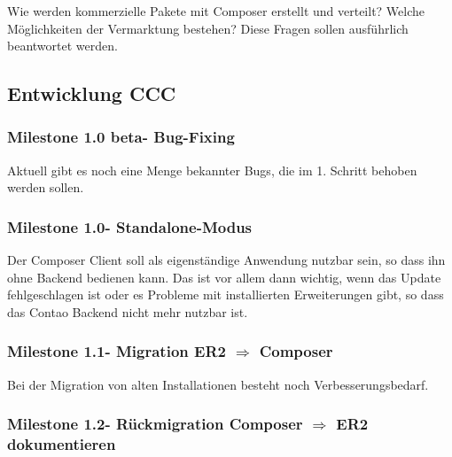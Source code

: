 \documentclass[
paper=a4,
draft=false,%
fontsize=10pt%
]{scrartcl}
\begin{document}
Wie werden kommerzielle Pakete mit Composer erstellt und verteilt? Welche Möglichkeiten der Vermarktung bestehen? Diese Fragen sollen ausführlich beantwortet werden.

\subsection{Entwicklung CCC}

\subsubsection{Milestone 1.0 beta\footnotemark - Bug-Fixing}


Aktuell gibt es noch eine Menge bekannter Bugs, die im 1. Schritt behoben werden sollen.

\subsubsection{Milestone 1.0\footnotemark - Standalone-Modus}


Der Composer Client soll als eigenständige Anwendung nutzbar sein, so dass ihn ohne Backend bedienen kann. Das ist vor allem dann wichtig, wenn das Update fehlgeschlagen ist oder es Probleme mit installierten Erweiterungen gibt, so dass das Contao Backend nicht mehr nutzbar ist.

\subsubsection{Milestone 1.1\footnotemark - Migration ER2 $ \Rightarrow $ Composer}


Bei der Migration von alten Installationen besteht noch Verbesserungsbedarf.

\subsubsection{Milestone 1.2\footnotemark - Rückmigration Composer $ \Rightarrow $ ER2 dokumentieren}
\end{document}
